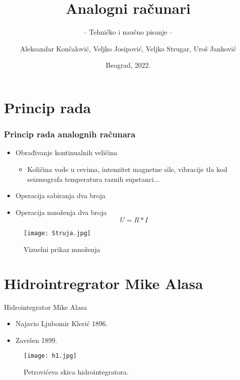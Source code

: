 \documentclass[14pt]{beamer}
\title{Analogni računari}
\subtitle{-- Tehničko i naučno pisanje --}
\author{Aleksandar Končalović, Veljko Josipović, Veljko Strugar, Uroš Janković}
\institute{Matematički fakultet\\Univerzitet u Beogradu}
\date{
	\footnotesize{Beograd, 2022.}	
}
\begin{document}
\begin{frame}
	\thispagestyle{empty}
	\titlepage
\end{frame}

\addtocounter{framenumber}{-1}

\section{Princip rada}

\begin{frame}[fragile]\frametitle{Princip rada analognih računara}
	\begin{itemize}	
		\item Obrađivanje kontinualnih veličina
		  \begin{itemize}
                \item Količina vode u cevima, intenzitet magnetne sile, vibracije tla kod seizmografa temperatura raznih supstanci...
            \end{itemize}          
	

\item Operacija sabiranja dva broja

\item Operacija množenja dva broja \\ $$ U = R*I $$
\end{itemize}
\begin{figure}[h!]
\begin{center}
\texttt{[image: Struja.jpg]}
\end{center}
\caption{Vizuelni prikaz množenja}
\label{fig:h1}
\end{figure}
\end{frame}

\section{Hidrointregrator Mike Alasa}
\begin{frame}{Hidrointegrator Mike Alasa}
\begin{itemize}
    \item Najavio Ljubomir Klerić 1896.
    \item Završen 1899.
\end{itemize}
\begin{figure}[h!]
\begin{center}
\texttt{[image: h1.jpg]}
\end{center}
\caption{Petrovićeva skica hidrointegratora. }
\label{fig:h1}
\end{figure}
    
\end{frame}
\end{document}
